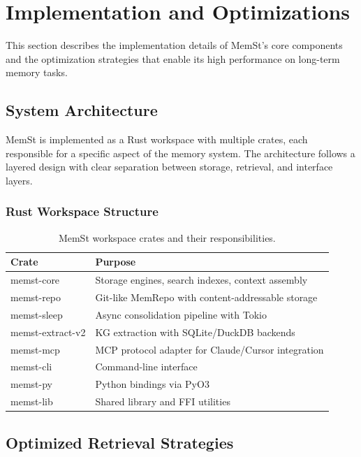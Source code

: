 \section{Implementation and Optimizations}
\label{sec:implementation}

This section describes the implementation details of MemSt's core components and the optimization strategies that enable its high performance on long-term memory tasks.

\subsection{System Architecture}

MemSt is implemented as a Rust workspace with multiple crates, each responsible for a specific aspect of the memory system. The architecture follows a layered design with clear separation between storage, retrieval, and interface layers.

\subsubsection{Rust Workspace Structure}

\begin{table}[ht]
\centering
\caption{MemSt workspace crates and their responsibilities.}
\label{tab:crates}
\begin{tabular}{@{}lp{7cm}@{}}
\toprule
\textbf{Crate} & \textbf{Purpose} \\
\midrule
memst-core & Storage engines, search indexes, context assembly \\
memst-repo & Git-like MemRepo with content-addressable storage \\
memst-sleep & Async consolidation pipeline with Tokio \\
memst-extract-v2 & KG extraction with SQLite/DuckDB backends \\
memst-mcp & MCP protocol adapter for Claude/Cursor integration \\
memst-cli & Command-line interface \\
memst-py & Python bindings via PyO3 \\
memst-lib & Shared library and FFI utilities \\
\bottomrule
\end{tabular}
\end{table}

\subsection{Optimized Retrieval Strategies}

